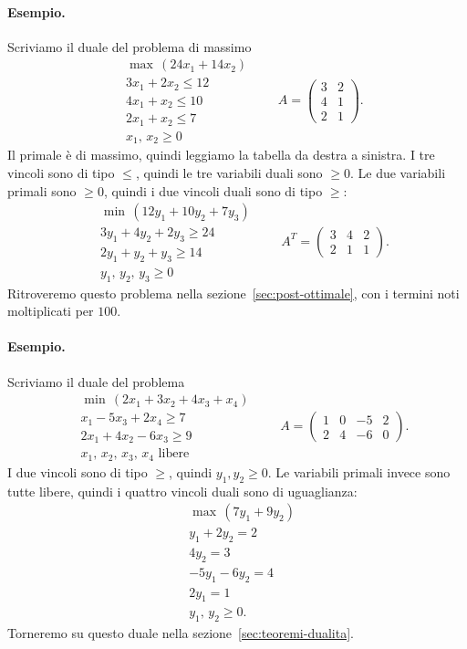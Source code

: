 \paragraph{Esempio.}
Scriviamo il duale del problema di massimo
\[
\begin{aligned}
&\max\, (24x_1 + 14x_2) \\
&3x_1 + 2x_2 \le 12 \\
&4x_1 + x_2 \le 10 \\
&2x_1 + x_2 \le 7 \\
&x_1,\, x_2 \ge 0
\end{aligned}
\qquad
A = \begin{pmatrix} 3 & 2 \\ 4 & 1 \\ 2 & 1 \end{pmatrix}.
\]
Il primale è di massimo, quindi leggiamo la tabella da destra a sinistra. I tre vincoli sono di tipo $\le$, quindi le tre variabili duali sono $\ge 0$. Le due variabili primali sono $\ge 0$, quindi i due vincoli duali sono di tipo $\ge$:
\[
\begin{aligned}
&\min\, (12y_1 + 10y_2 + 7y_3) \\
&3y_1 + 4y_2 + 2y_3 \ge 24 \\
&2y_1 + y_2 + y_3 \ge 14 \\
&y_1,\, y_2,\, y_3 \ge 0
\end{aligned}
\qquad
A^T = \begin{pmatrix} 3 & 4 & 2 \\ 2 & 1 & 1 \end{pmatrix}.
\]
Ritroveremo questo problema nella sezione~\ref{sec:post-ottimale}, con i termini noti moltiplicati per $100$.

\paragraph{Esempio.}
Scriviamo il duale del problema
\[
\begin{aligned}
&\min\, (2x_1 + 3x_2 + 4x_3 + x_4) \\
&x_1 - 5x_3 + 2x_4 \ge 7 \\
&2x_1 + 4x_2 - 6x_3 \ge 9 \\
&x_1,\, x_2,\, x_3,\, x_4 \text{ libere}
\end{aligned}
\qquad
A = \begin{pmatrix} 1 & 0 & -5 & 2 \\ 2 & 4 & -6 & 0 \end{pmatrix}.
\]
I due vincoli sono di tipo $\ge$, quindi $y_1, y_2 \ge 0$. Le variabili primali invece sono tutte libere, quindi i quattro vincoli duali sono di uguaglianza:
\[
\begin{aligned}
&\max\, (7y_1 + 9y_2) \\
&y_1 + 2y_2 = 2 \\
&4y_2 = 3 \\
&{-5y_1} - 6y_2 = 4 \\
&2y_1 = 1 \\
&y_1,\, y_2 \ge 0.
\end{aligned}
\]
Torneremo su questo duale nella sezione~\ref{sec:teoremi-dualita}.

